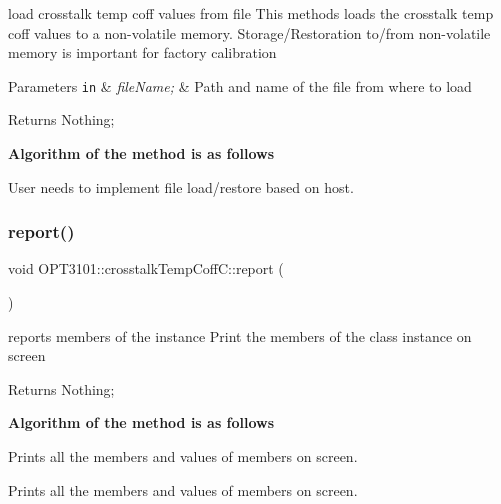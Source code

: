 load crosstalk temp coff values from file This methods loads the crosstalk temp coff values to a non-\/volatile memory. Storage/\+Restoration to/from non-\/volatile memory is important for factory calibration 


\begin{DoxyParams}[1]{Parameters}
\mbox{\tt in}  & {\em file\+Name;} & Path and name of the file from where to load \\
\hline
\end{DoxyParams}
\begin{DoxyReturn}{Returns}
Nothing; 
\end{DoxyReturn}
{\bfseries Algorithm of the method is as follows}


\begin{DoxyItemize}
\item User needs to implement file load/restore based on host. 
\end{DoxyItemize}\mbox{\label{class_o_p_t3101_1_1crosstalk_temp_coff_c_a881ec5ebe971af6c4c4f50e143d64f9a}} 
\subsubsection{\texorpdfstring{report()}{report()}}
{\footnotesize\ttfamily void O\+P\+T3101\+::crosstalk\+Temp\+Coff\+C\+::report (\begin{DoxyParamCaption}{ }\end{DoxyParamCaption})}



reports members of the instance Print the members of the class instance on screen 

\begin{DoxyReturn}{Returns}
Nothing; 
\end{DoxyReturn}
{\bfseries Algorithm of the method is as follows}


\begin{DoxyItemize}
\item Prints all the members and values of members on screen. ~\newline

\item Prints all the members and values of members on screen. 
\end{DoxyItemize}\mbox{\label{class_o_p_t3101_1_1crosstalk_temp_coff_c_aa24b81ff4f56b9f0f832b57086c87eb8}} 
